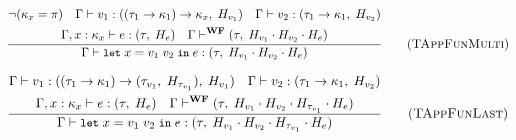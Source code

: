 \begin{figure}[ht]
    \vspace{20pt}

    \begin{equation}
        \frac{
            \begin{gathered}
                \neg(\kappa_x = \pi) \quad \Gamma \vdash v_1 : ((\tau_1 \rightarrow \kappa_1) \rightarrow \kappa_x, \; H_{v_1}) \quad \Gamma \vdash v_2: (\tau_1 \rightarrow \kappa_1, \; H_{v_2}) \\
                \Gamma, x : \kappa_x \vdash e: (\tau, \; H_e) \quad \Gamma \vdash^{\textbf{WF}} (\tau, \; H_{v_1} \cdot H_{v_2} \cdot H_e)
            \end{gathered}
        }{
            \Gamma \vdash \texttt{\small{let}}\;x = v_1\;v_2\;\texttt{\small{in}}\;e : (\tau, \; H_{v_1} \cdot H_{v_2} \cdot H_e)
        }
        \tag{\textsc{TAppFunMulti}}
    \end{equation}

    \vspace{20pt}

    \begin{equation}
        \frac{
            \begin{gathered}
                \Gamma \vdash v_1 : ((\tau_1 \rightarrow \kappa_1) \rightarrow (\tau_{v_1}, \; H_{\tau_{v_1}}), \; H_{v_1}) \quad \Gamma \vdash v_2: (\tau_1 \rightarrow \kappa_1, \; H_{v_2}) \\
                \Gamma, x : \kappa_x \vdash e: (\tau, \; H_e) \quad \Gamma \vdash^{\textbf{WF}} (\tau, \; H_{v_1} \cdot H_{v_2} \cdot H_{\tau_{v_1}} \cdot H_e)
            \end{gathered}
        }{
            \Gamma \vdash \texttt{\small{let}}\;x = v_1\;v_2\;\texttt{\small{in}}\;e : (\tau, \; H_{v_1} \cdot H_{v_2} \cdot H_{\tau_{v_1}} \cdot H_e)
        }
        \tag{\textsc{TAppFunLast}}
    \end{equation}
\end{figure}